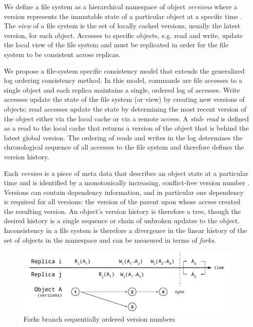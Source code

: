 \documentclass{article}
\begin{document}
We define a file system as a hierarchical namespace of object \textit{versions} where a version represents the immutable state of a particular object at a specific time \cite{helland_immutability_2015}. The \textit{view} of a file system is the set of locally cached versions, usually the latest version, for each object. Accesses to specific objects, e.g. read and write, update the local view of the file system and must be replicated in order for the file system to be consistent across replicas.

We propose a file-system specific consistency model that extends the generalized log ordering consistency method. In this model, commands are file accesses to a single object and each replica maintains a single, ordered log of accesses. Write accesses update the state of the file system (or view) by creating new versions of objects; read accesses update the state by determining the most recent version of the object either via the local cache or via a remote access. A \textit{stale read} is defined as a read to the local cache that returns a version of the object that is behind the latest global version. The ordering of reads and writes in the log determines the chronological sequence of all accesses to the file system and therefore defines the version history.

Each \textit{version} is a piece of meta data that describes an object state at a particular time and is identified by a monotonically increasing, conflict-free version number \cite{parker_detection_1983}. Versions can contain dependency information, and in particular one dependency is required for all versions: the version of the parent upon whose access created the resulting version. An object's version history is therefore a tree, though the desired history is a single sequence or chain of unbroken updates to the object. Inconsistency in a file system is therefore a divergence in the linear history of the set of objects in the namespace and can be measured in terms of \textit{forks}.

\begin{figure}
    \centering
        \includegraphics[width=.9\textwidth]{figures/forks}
        \caption{Forks branch sequentially ordered version numbers}
        \label{fig:forks}
\end{figure}
\end{document}
